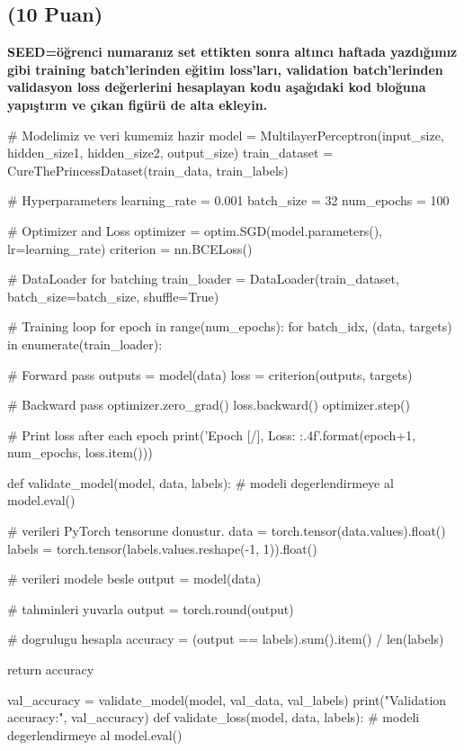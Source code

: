 \documentclass[11pt]{article}
\begin{document}
\newpage
\subsection{(10 Puan)} \textbf{SEED=öğrenci numaranız set ettikten sonra altıncı haftada yazdığımız gibi training batch'lerinden eğitim loss'ları, validation batch'lerinden validasyon loss değerlerini hesaplayan kodu aşağıdaki kod bloğuna yapıştırın ve çıkan figürü de alta ekleyin.}

\begin{python}

# Modelimiz ve veri kumemiz hazir
model = MultilayerPerceptron(input_size, hidden_size1, hidden_size2, output_size)
train_dataset = CureThePrincessDataset(train_data, train_labels)

# Hyperparameters
learning_rate = 0.001
batch_size = 32
num_epochs = 100

# Optimizer and Loss
optimizer = optim.SGD(model.parameters(), lr=learning_rate)
criterion = nn.BCELoss()

# DataLoader for batching
train_loader = DataLoader(train_dataset, batch_size=batch_size, shuffle=True)

# Training loop
for epoch in range(num_epochs):
    for batch_idx, (data, targets) in enumerate(train_loader):
        
        # Forward pass
        outputs = model(data)
        loss = criterion(outputs, targets)
        
        # Backward pass
        optimizer.zero_grad()
        loss.backward()
        optimizer.step()
        
    # Print loss after each epoch
    print('Epoch [{}/{}], Loss: {:.4f}'.format(epoch+1, num_epochs, loss.item()))

    def validate_model(model, data, labels):
    # modeli degerlendirmeye al
    model.eval()

    # verileri PyTorch tensorune donustur.
    data = torch.tensor(data.values).float()
    labels = torch.tensor(labels.values.reshape(-1, 1)).float()

    # verileri modele besle
    output = model(data)

    # tahminleri yuvarla
    output = torch.round(output)

    # dogrulugu hesapla
    accuracy = (output == labels).sum().item() / len(labels)

    return accuracy

val_accuracy = validate_model(model, val_data, val_labels)
print("Validation accuracy:", val_accuracy)
def validate_loss(model, data, labels):
    # modeli degerlendirmeye al
    model.eval()


\end{python}
\end{document}
